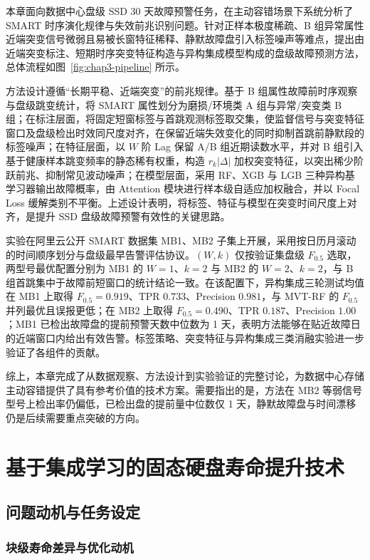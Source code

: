 本章面向数据中心盘级 SSD 30 天故障预警任务，在主动容错场景下系统分析了 SMART 时序演化规律与失效前兆识别问题。针对正样本极度稀疏、B 组异常属性近端突变信号微弱且易被长窗特征稀释、静默故障盘引入标签噪声等难点，提出由近端突变标注、短期时序突变特征构造与异构集成模型构成的盘级故障预测方法，总体流程如图~\ref{fig:chap3-pipeline} 所示。

方法设计遵循“长期平稳、近端突变”的前兆规律。基于 B 组属性故障前时序观察与盘级跳变统计，将 SMART 属性划分为磨损/环境类 A 组与异常/突变类 B 组；在标注层面，将固定短窗标签与首跳观测标签取交集，使监督信号与突变特征窗口及盘级检出时效同尺度对齐，在保留近端失效变化的同时抑制首跳前静默段的标签噪声；在特征层面，以 $W$ 阶 Lag 保留 A/B 组近期读数水平，并对 B 组引入基于健康样本跳变频率的静态稀有权重，构造 $r_k|\Delta|$ 加权突变特征，以突出稀少阶跃前兆、抑制常见波动噪声；在模型层面，采用 RF、XGB 与 LGB 三种异构基学习器输出故障概率，由 Attention 模块进行样本级自适应加权融合，并以 Focal Loss 缓解类别不平衡。上述设计表明，将标签、特征与模型在突变时间尺度上对齐，是提升 SSD 盘级故障预警有效性的关键思路。

实验在阿里云公开 SMART 数据集 MB1、MB2 子集上开展，采用按日历月滚动的时间顺序划分与盘级最早告警评估协议。$(W,k)$ 仅按验证集盘级 $F_{0.5}$ 选取，两型号最优配置分别为 MB1 的 $W{=}1$、$k{=}2$ 与 MB2 的 $W{=}2$、$k{=}2$，与 B 组首跳集中于故障前短窗口的统计结论一致。在该配置下，异构集成三轮测试均值在 MB1 上取得 $F_{0.5}{=}0.919$、TPR $0.733$、Precision $0.981$，与 MVT-RF 的 $F_{0.5}$ 并列最优且误报更低；在 MB2 上取得 $F_{0.5}{=}0.490$、TPR $0.187$、Precision $1.00$；MB1 已检出故障盘的提前预警天数中位数为 1 天，表明方法能够在贴近故障日的近端窗口内给出有效告警。标签策略、突变特征与异构集成三类消融实验进一步验证了各组件的贡献。

综上，本章完成了从数据观察、方法设计到实验验证的完整讨论，为数据中心存储主动容错提供了具有参考价值的技术方案。需要指出的是，方法在 MB2 等弱信号型号上检出率仍偏低，已检出盘的提前量中位数仅 1 天，静默故障盘与时间漂移仍是后续需要重点突破的方向。

\chapter{基于集成学习的固态硬盘寿命提升技术}

\section{问题动机与任务设定}

\subsection{块级寿命差异与优化动机}

